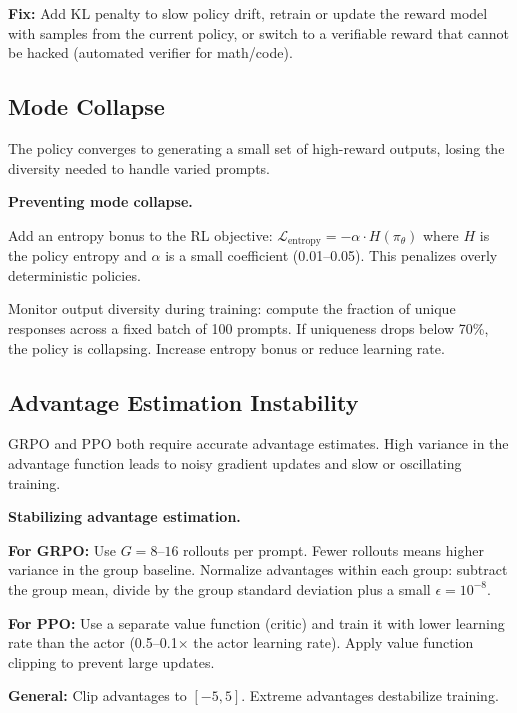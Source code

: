 \begin{chapterenv}
\begin{infobox}
\textbf{Fix:} Add KL penalty to slow policy drift, retrain or update the reward model with samples from the current policy, or switch to a verifiable reward that cannot be hacked (automated verifier for math/code).
\end{infobox}

\subsection{Mode Collapse}

The policy converges to generating a small set of high-reward outputs, losing the diversity needed to handle varied prompts.

\begin{tipbox}
\textbf{Preventing mode collapse.}

Add an entropy bonus to the RL objective: $\mathcal{L}_{\text{entropy}} = -\alpha \cdot H(\pi_\theta)$ where $H$ is the policy entropy and $\alpha$ is a small coefficient (0.01--0.05). This penalizes overly deterministic policies.

Monitor output diversity during training: compute the fraction of unique responses across a fixed batch of 100 prompts. If uniqueness drops below 70\%, the policy is collapsing. Increase entropy bonus or reduce learning rate.
\end{tipbox}

\subsection{Advantage Estimation Instability}

GRPO and PPO both require accurate advantage estimates. High variance in the advantage function leads to noisy gradient updates and slow or oscillating training.

\begin{infobox}
\textbf{Stabilizing advantage estimation.}

\textbf{For GRPO:} Use $G = 8$--$16$ rollouts per prompt. Fewer rollouts means higher variance in the group baseline. Normalize advantages within each group: subtract the group mean, divide by the group standard deviation plus a small $\epsilon = 10^{-8}$.

\textbf{For PPO:} Use a separate value function (critic) and train it with lower learning rate than the actor (0.5--0.1$\times$ the actor learning rate). Apply value function clipping to prevent large updates.

\textbf{General:} Clip advantages to $[-5, 5]$. Extreme advantages destabilize training.
\end{infobox}


\end{chapterenv}
